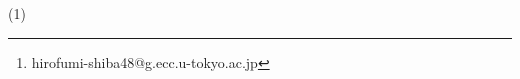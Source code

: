 \documentclass[uplatex, dvipdfmx]{jsreport}
\title{}
\author{Hirofumi Shiba\thanks{hirofumi-shiba48@g.ecc.u-tokyo.ac.jp}}
\date{\today}
\begin{document}
(1)
\end{document}
